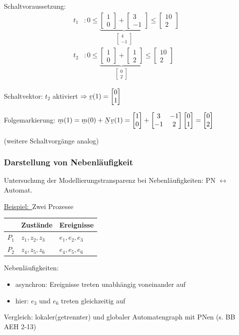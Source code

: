 \documentclass[12pt,a4paper]{scrartcl}
\numberwithin{equation}{section}
\newcommand{\beispiel}{\underline{Beispiel:~}}
\newcommand{\ubar}[1]{\underaccent{\bar}{#1}}
\newcommand\m[1]{\begin{bmatrix}#1\end{bmatrix}}
\begin{document}
Schaltvoraussetzung:
\begin{subequations}
	\begin{align}
	t_1 &: 0 \le \underbrace{\m{1\\0}+\m{3\\-1}}_{\m{4\\-1}} \le \m{10\\2}\\[2ex]
	t_2 &: 0 \le \underbrace{\m{1\\0}+\m{1\\2}}_{\m{0\\2}} \le \m{10\\2}
	\end{align}
\end{subequations}

Schaltvektor: $t_2$ aktiviert $\Rightarrow \ubar{v}(1)=\m{0\\1}$

Folgemarkierung: $\ubar{m}(1)=\ubar{m}(0) + \ubar{N} \ubar{v}(1) = \m{1\\0}+\m{3&-1\\-1&2} \m{0\\1} = \m{0\\2}$

(weitere Schaltvorgänge analog)

\subsubsection{Darstellung von Nebenläufigkeit}
Untersuchung der Modellierungstransparenz bei Nebenläufigkeiten: PN $\leftrightarrow$ Automat.

\beispiel Zwei Prozesse

\begin{tabular}{l|l|l}
	 & Zustände & Ereignisse \\
	 \hline
	 $P_1$ & $z_1,z_2,z_3$ & $e_1,e_2,e_3$ \\
	 \hline
	 $P_2$ & $z_4,z_5,z_6$ & $e_4,e_5,e_6$ 
\end{tabular}

Nebenläufigkeiten: 
\begin{itemize}
	\item asynchron: Ereignisse treten unabhängig voneinander auf
	\item hier: $e_3$ und $e_6$ treten gleichzeitig auf
\end{itemize}

Vergleich: lokaler(getrennter) und globaler Automatengraph mit PNen (s. BB AEH 2-13)
\end{document}

